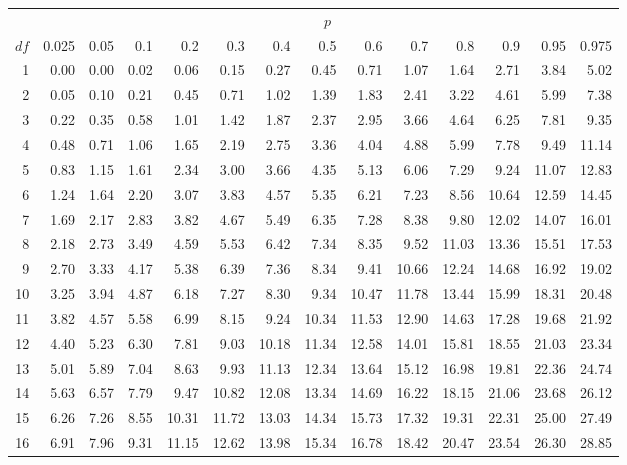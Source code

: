 \begin{table}[!ht]
\centering
\begin{tabular}{@{}r@{~~}r@{~~}r@{~~}r@{~~}r@{~~}r@{~~}r@{~~}r@{~~}r@{~~}r@{~~}r@{~~}r@{~~}r@{~~}r@{}}
 & \multicolumn{13}{c}{$p$} \\ \cline{2-14}
$df$ & 0.025 & 0.05 & 0.1 & 0.2 & 0.3 & 0.4 & 0.5 & 0.6 & 0.7 & 0.8 & 0.9 & 0.95 & 0.975 \\ 
  \hline
1 & 0.00 & 0.00 & 0.02 & 0.06 & 0.15 & 0.27 & 0.45 & 0.71 & 1.07 & 1.64 & 2.71 & 3.84 & 5.02 \\ 
  2 & 0.05 & 0.10 & 0.21 & 0.45 & 0.71 & 1.02 & 1.39 & 1.83 & 2.41 & 3.22 & 4.61 & 5.99 & 7.38 \\ 
  3 & 0.22 & 0.35 & 0.58 & 1.01 & 1.42 & 1.87 & 2.37 & 2.95 & 3.66 & 4.64 & 6.25 & 7.81 & 9.35 \\ 
  4 & 0.48 & 0.71 & 1.06 & 1.65 & 2.19 & 2.75 & 3.36 & 4.04 & 4.88 & 5.99 & 7.78 & 9.49 & 11.14 \\ 
  5 & 0.83 & 1.15 & 1.61 & 2.34 & 3.00 & 3.66 & 4.35 & 5.13 & 6.06 & 7.29 & 9.24 & 11.07 & 12.83 \\ 
  6 & 1.24 & 1.64 & 2.20 & 3.07 & 3.83 & 4.57 & 5.35 & 6.21 & 7.23 & 8.56 & 10.64 & 12.59 & 14.45 \\ 
  7 & 1.69 & 2.17 & 2.83 & 3.82 & 4.67 & 5.49 & 6.35 & 7.28 & 8.38 & 9.80 & 12.02 & 14.07 & 16.01 \\ 
  8 & 2.18 & 2.73 & 3.49 & 4.59 & 5.53 & 6.42 & 7.34 & 8.35 & 9.52 & 11.03 & 13.36 & 15.51 & 17.53 \\ 
  9 & 2.70 & 3.33 & 4.17 & 5.38 & 6.39 & 7.36 & 8.34 & 9.41 & 10.66 & 12.24 & 14.68 & 16.92 & 19.02 \\ 
  10 & 3.25 & 3.94 & 4.87 & 6.18 & 7.27 & 8.30 & 9.34 & 10.47 & 11.78 & 13.44 & 15.99 & 18.31 & 20.48 \\ 
  11 & 3.82 & 4.57 & 5.58 & 6.99 & 8.15 & 9.24 & 10.34 & 11.53 & 12.90 & 14.63 & 17.28 & 19.68 & 21.92 \\ 
  12 & 4.40 & 5.23 & 6.30 & 7.81 & 9.03 & 10.18 & 11.34 & 12.58 & 14.01 & 15.81 & 18.55 & 21.03 & 23.34 \\ 
  13 & 5.01 & 5.89 & 7.04 & 8.63 & 9.93 & 11.13 & 12.34 & 13.64 & 15.12 & 16.98 & 19.81 & 22.36 & 24.74 \\ 
  14 & 5.63 & 6.57 & 7.79 & 9.47 & 10.82 & 12.08 & 13.34 & 14.69 & 16.22 & 18.15 & 21.06 & 23.68 & 26.12 \\ 
  15 & 6.26 & 7.26 & 8.55 & 10.31 & 11.72 & 13.03 & 14.34 & 15.73 & 17.32 & 19.31 & 22.31 & 25.00 & 27.49 \\ 
  16 & 6.91 & 7.96 & 9.31 & 11.15 & 12.62 & 13.98 & 15.34 & 16.78 & 18.42 & 20.47 & 23.54 & 26.30 & 28.85 \\ 

\end{tabular}
\end{table}

